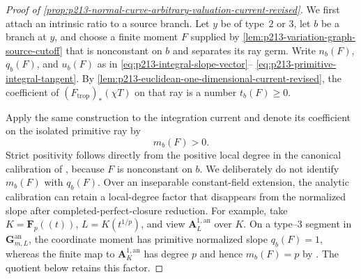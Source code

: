 \begin{proof}[Proof of
\cref{prop:p213-normal-curve-arbitrary-valuation-current-revised}]
We first attach an intrinsic ratio to a source branch.  Let $y$ be of
type~$2$ or $3$, let $b$ be a branch at $y$, and choose a finite moment
$F$ supplied by
\cref{lem:p213-variation-graph-source-cutoff} that is nonconstant on $b$
and separates its ray germ.  Write
$n_b(F)$, $q_b(F)$, and $u_b(F)$ as in
\eqref{eq:p213-integral-slope-vector}--
\eqref{eq:p213-primitive-integral-tangent}.  By
\cref{lem:p213-euclidean-one-dimensional-current-revised}, the coefficient
of $(F_{\mathrm{trop}})_*(\chi T)$ on that ray is a number
$t_b(F)\geq0$.

Apply the same construction to the integration current and denote its
coefficient on the isolated primitive ray by
\begin{equation}
                              m_b(F)>0.
\label{eq:p213-actual-calibration-coefficient-revised}
\end{equation}
Strict positivity follows directly from the positive local degree in the
canonical calibration of
\cite[Proposition~14.3.1, \S14.3.2, and Definition~14.5.1]{CLD25},
because $F$ is nonconstant on $b$.  We deliberately do not identify
$m_b(F)$ with $q_b(F)$.  Over an inseparable constant-field extension,
the analytic calibration can retain a local-degree factor that disappears
from the normalized slope after completed-perfect-closure reduction.
For example, take $K=\mathbf F_p((t))$, $L=K(t^{1/p})$, and view
$\mathbf A^{1,\mathrm{an}}_L$ over $K$.  On a type--$3$ segment in
$\mathbf G_{m,L}^{\mathrm{an}}$, the coordinate moment has primitive
normalized slope $q_b(F)=1$, whereas the finite map to
$\mathbf A^{1,\mathrm{an}}_K$ has degree $p$ and hence
$m_b(F)=p$ by \cite[Remark~14.4.3]{CLD25}.  The quotient below retains
this factor.


\end{proof}
